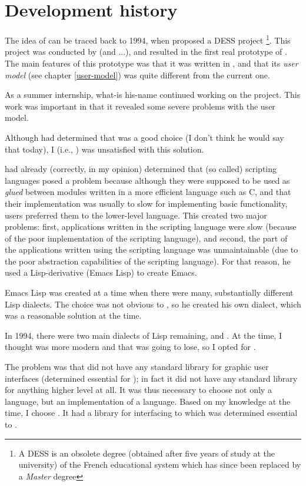 \chapter{Development history}

The idea of \sysname{} can be traced back to 1994, when {\rs} proposed a
DESS project \footnote{A DESS is an obsolete degree (obtained after
five years of study at the university) of the French educational
system which has since been replaced by a \emph{Master} degree}.
This project was conducted by {\kerhoas} (and ...), and resulted
in the first real prototype of \sysname{}.  The main features of this
prototype was that it was written in {\tcl}, and that its \emph{user
  model} (see chapter \ref{user-model}) was quite different from the
current one. 

As a summer internship, what-is his-name continued working on the
project.  This work was important in that it revealed some severe
problems with the user model.

Although {\kerhoas} had determined that {\tcl} was a good choice (I
don't think he would say that today), I (i.e., {\rs}) was unsatisfied
with this solution.

{\rms} had already (correctly, in my opinion) determined that (so
called) scripting languages posed a problem because although they were
supposed to be used as \emph{glued} between modules written in a more
efficient language such as C, and that their implementation was
usually to slow for implementing basic functionality, users preferred
them to the lower-level language.  This created two major problems:
first, applications written in the scripting language were slow
(because of the poor implementation of the scripting language), and
second, the part of the applications written using the scripting
language was unmaintainable (due to the poor abstraction capabilities
of the scripting language).  For that reason, he used a
Lisp-derivative (Emacs Lisp) to create Emacs.  

Emacs Lisp was created at a time when there were many, substantially
different Lisp dialects.  The choice was not obvious to {\rms}, so he
created his own dialect, which was a reasonable solution at the time. 

In 1994, there were two main dialects of Lisp remaining, {\commonlisp} and
{\scheme}.  At the time, I thought {\scheme} was more modern and that
{\commonlisp} was going to lose, so I opted for {\scheme}.

The problem was that {\scheme} did not have any standard library for
graphic user interfaces (determined essential for \sysname{}); in fact it
did not have any standard library for anything higher level at all.
It was thus necessary to choose not only a language, but an
implementation of a language.  Based on my knowledge at the time, I
choose {\elk}.  It had a library for interfacing to {\xwin} which was
determined essential to \sysname{}.

